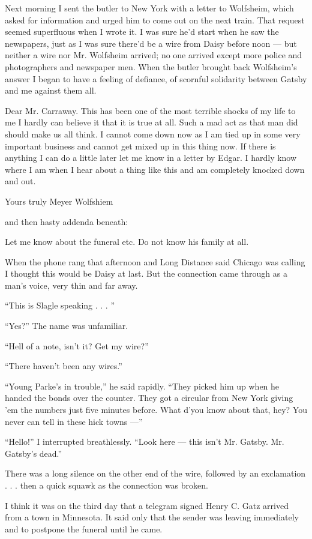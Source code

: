 \documentclass{znotebook}
\begin{document}
Next morning I sent the butler to New York with a letter to Wolfsheim, which asked for information and urged him to come out on the next train. That request seemed superfluous when I wrote it. I was sure he'd start when he saw the newspapers, just as I was sure there'd be a wire from Daisy before noon ---{} but neither a wire nor Mr. Wolfsheim arrived; no one arrived except more police and photographers and newspaper men. When the butler brought back Wolfsheim's answer I began to have a feeling of defiance, of scornful solidarity between Gatsby and me against them all.

Dear Mr. Carraway. This has been one of the most terrible shocks of my life to me I hardly can believe it that it is true at all. Such a mad act as that man did should make us all think. I cannot come down now as I am tied up in some very important business and cannot get mixed up in this thing now. If there is anything I can do a little later let me know in a letter by Edgar. I hardly know where I am when I hear about a thing like this and am completely knocked down and out.

Yours truly Meyer Wolfshiem

and then hasty addenda beneath:

Let me know about the funeral etc. Do not know his family at all.

When the phone rang that afternoon and Long Distance said Chicago was calling I thought this would be Daisy at last. But the connection came through as a man's voice, very thin and far away.

``This is Slagle speaking . . . ''

``Yes?'' The name was unfamiliar.

``Hell of a note, isn't it? Get my wire?''

``There haven't been any wires.''

``Young Parke's in trouble,'' he said rapidly. ``They picked him up when he handed the bonds over the counter. They got a circular from New York giving 'em the numbers just five minutes before. What d'you know about that, hey? You never can tell in these hick towns ---''

``Hello!'' I interrupted breathlessly. ``Look here ---{} this isn't Mr. Gatsby. Mr. Gatsby's dead.''

There was a long silence on the other end of the wire, followed by an exclamation . . . then a quick squawk as the connection was broken.

I think it was on the third day that a telegram signed Henry C. Gatz arrived from a town in Minnesota. It said only that the sender was leaving immediately and to postpone the funeral until he came.
\end{document}
